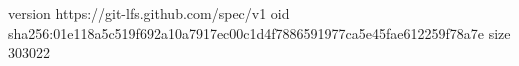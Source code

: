 version https://git-lfs.github.com/spec/v1
oid sha256:01e118a5c519f692a10a7917ec00c1d4f7886591977ca5e45fae612259f78a7e
size 303022
